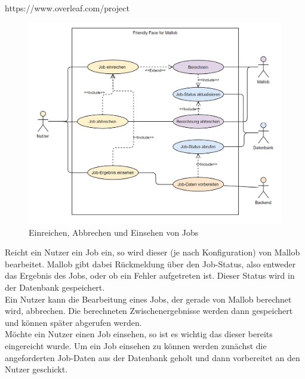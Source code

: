 https://www.overleaf.com/project
\begin{figure}[H]
    \centering
    \includegraphics[width=\textwidth]{images-interface/Diagramme/Submit-abort-view-screenshot.jpg}
    \caption{Einreichen, Abbrechen und Einsehen von Jobs}
\end{figure}

Reicht ein Nutzer ein Job ein, so wird dieser (je nach Konfiguration) von Mallob bearbeitet. Mallob gibt dabei Rückmeldung über den Job-Status, also entweder das Ergebnis des Jobs, oder ob ein Fehler aufgetreten ist. Dieser Status wird in der Datenbank gespeichert. \\
Ein Nutzer kann die Bearbeitung eines Jobs, der gerade von Mallob berechnet wird, abbrechen. Die berechneten Zwischenergebnisse werden dann gespeichert und können später abgerufen werden. \\
Möchte ein Nutzer einen Job einsehen, so ist es wichtig das dieser bereits eingereicht wurde. Um ein Job einsehen zu können werden zunächst die angeforderten Job-Daten aus der Datenbank geholt und dann vorbereitet an den Nutzer geschickt.





